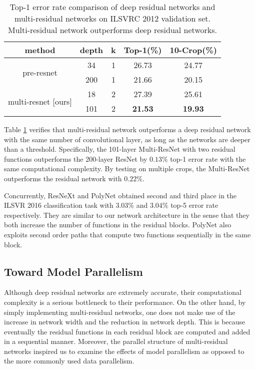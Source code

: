 \documentclass[journal]{IEEEtran}
\begin{document}
\begin{table}[!htb]
\centering
\begin{tabular}{||c c c c c ||} 
\hline
method & depth & k & Top-1(\%) & 10-Crop(\%)   \\ 
\hline\hline
\multirow{2}{4.9em}{pre-resnet \cite{he2016identity}} 
& 34 & 1& 26.73 & 24.77 \\ 
& 200 & 1& 21.66 & 20.15 \\ 
\hline
\multirow{2}{4.9em}{multi-resnet [ours]} 
& 18 & 2& 27.39 & 25.61 \\ 
& 101 & 2& \textbf{21.53} & \textbf{19.93}  \\ 
\hline

\end{tabular}
\caption{Top-1 error rate comparison of deep residual networks and multi-residual networks on ILSVRC 2012 validation set. Multi-residual network outperforms deep residual networks.}
\label{table:img}
\end{table}

Table \ref{table:img} verifies that multi-residual network outperforms a deep residual network with the same number of convolutional layer, as long as the networks are deeper than a threshold. Specifically, the 101-layer Multi-ResNet with two residual functions outperforms the 200-layer ResNet by $0.13\%$ top-1 error rate with the same computational complexity. By testing on multiple crops, the Multi-ResNet outperforms the residual network with $0.22\%$.%

Concurrently, ResNeXt \cite{xie2016aggregated} and PolyNet \cite{zhang2016polynet} obtained  second and third place in the ILSVR 2016 classification task with $3.03\%$ and $3.04\%$ top-5 error rate respectively. They are similar to our network architecture in the sense that they both increase the number of functions in the residual blocks. PolyNet also exploits second order paths that compute two functions sequentially in the same block.



\subsection{Toward Model Parallelism}
Although deep residual networks are extremely accurate, their computational complexity is a serious bottleneck to their performance. On the other hand, by simply implementing multi-residual networks, one does not make use of the increase in network width and the reduction in network depth. This is because eventually the residual functions in each residual block are computed and added in a sequential manner. Moreover, the parallel structure of multi-residual networks inspired us to examine the effects of model parallelism as opposed to the more commonly used data parallelism.
\end{document}
